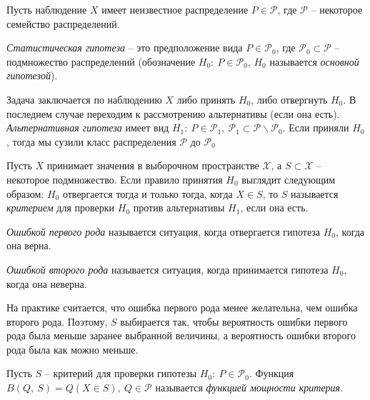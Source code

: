 Пусть наблюдение $\displaystyle X$ имеет неизвестное распределение $\displaystyle P\in \mathcal{P}$, где $\displaystyle \mathcal{P}$ -- некоторое семейство распределений.
\begin{definition}
    \textit{Статистическая гипотеза} -- это предположение вида $\displaystyle P\in \mathcal{P}_{0}$, где $\displaystyle \mathcal{P}_{0} \subset \mathcal{P}$ -- подмножество распределений (обозначение $\displaystyle H_{0} :\ P\in \mathcal{P}_{0}$, $\displaystyle H_{0}$ называется \textit{основной гипотезой}).
\end{definition}
Задача заключается по наблюдению $\displaystyle X$ либо принять $\displaystyle H_{0}$, либо отвергнуть $\displaystyle H_{0}$. В последнем случае переходим к рассмотрению альтернативы (если она есть). \textit{Альтернативная гипотеза} имеет вид $\displaystyle H_{1} :\ P\in \mathcal{P}_{1} ,\ \mathcal{P}_{1} \subset \mathcal{P} \backslash \mathcal{P}_{0}$. Если приняли $\displaystyle H_{0}$, тогда мы сузили класс распределения $\mathcal{P}$ до $\mathcal{P}_0$
\begin{definition}
    Пусть $\displaystyle X$ принимает значения в выборочном пространстве $\displaystyle \mathcal{X}$, а $\displaystyle S\subset \mathcal{X}$ -- некоторое подмножество. Если правило принятия $\displaystyle H_{0}$ выглядит следующим образом: $\displaystyle H_{0}$ отвергается тогда и только тогда, когда $\displaystyle X\in S$, то $\displaystyle S$ называется \textit{критерием} для проверки $\displaystyle H_{0}$ против альтернативы $\displaystyle H_{1}$, если она есть.
\end{definition}
\begin{definition}
    \textit{Ошибкой первого рода} называется ситуация, когда отвергается гипотеза $\displaystyle H_{0}$, когда она верна.
\end{definition}
\begin{definition}
    \textit{Ошибкой второго рода} называется ситуация, когда принимается гипотеза $\displaystyle H_{0}$, когда она неверна.
\end{definition}
\begin{note}
    На практике считается, что ошибка первого рода менее желательна, чем ошибка второго рода. Поэтому, $\displaystyle S$ выбирается так, чтобы вероятность ошибки первого рода была меньше заранее выбранной величины, а вероятность ошибки второго рода была как можно меньше.
\end{note}
\begin{definition}
    Пусть $\displaystyle S$ -- критерий для проверки гипотезы $\displaystyle H_{0} :\ P\in \mathcal{P}_{0}$. Функция $\displaystyle B( Q,\ S) =Q( X\in S) ,\ Q\in \mathcal{P}$ называется \textit{функцией мощности критерия}\textit{.}
\end{definition}
